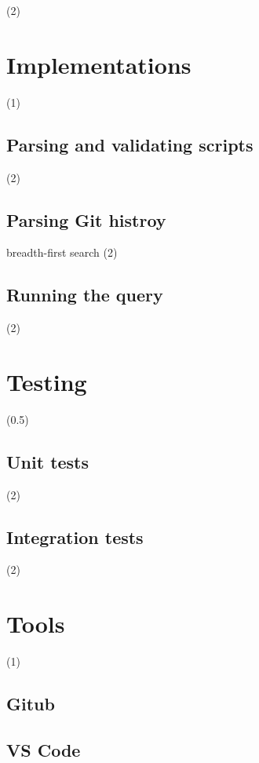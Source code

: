 (2)

\section{Implementations}

(1)

\subsection{Parsing and validating scripts}

(2)

\subsection{Parsing Git histroy}

breadth-first search (2)

\subsection{Running the query}

(2)

\section{Testing}

(0.5)

\subsection{Unit tests}

(2)

\subsection{Integration tests}

(2)

\section{Tools}

(1)

\subsection{Gitub}

\subsection{VS Code}